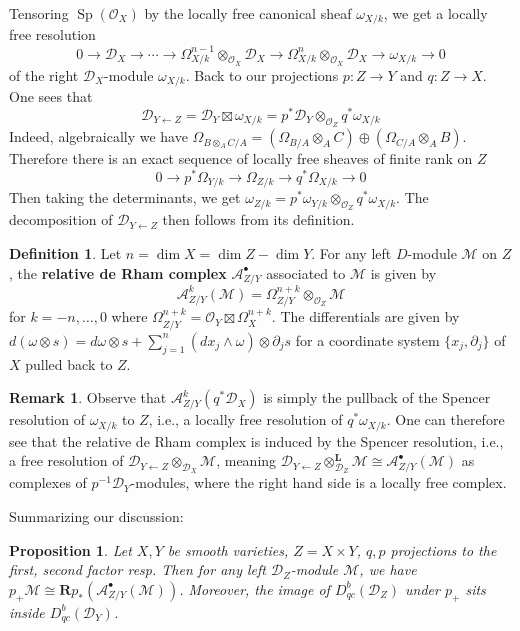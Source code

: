 \documentclass[11pt, a4paper]{article}
\newtheorem{proposition}[theorem]{Proposition}
\theoremstyle{definition}
\newtheorem{remark}[theorem]{Remark}
\newtheorem{definition}[theorem]{Definition}
\newcommand{\w}[0]{\omega}
\newcommand{\dL}{\mathbf{L}}
\newcommand{\dR}{\mathbf{R}}
\newcommand{\Sp}{\operatorname{Sp}}
\begin{document}
    Tensoring $\Sp(\mathcal O_X)$ by the locally free canonical sheaf $\w_{X/k}$, we get a locally free resolution
    \[0\to\mathcal D_X\to\cdots\to\Omega_{X/k}^{n-1}\otimes_{\mathcal O_X}\mathcal D_X\to \Omega_{X/k}^n\otimes_{\mathcal O_X}\mathcal D_X\to\w_{X/k}\to 0\]
    of the right $\mathcal D_X$-module $\w_{X/k}$. Back to our projections $p:Z\to Y$ and $q:Z\to X$. One sees that
    \[\mathcal D_{Y\leftarrow Z}=\mathcal D_Y\boxtimes \w_{X/k}=p^*\mathcal D_Y\otimes_{\mathcal O_Z}q^*\w_{X/k}\]
    Indeed, algebraically we have $\Omega_{B\otimes_A C/A}=(\Omega_{B/A}\otimes_A C)\oplus (\Omega_{C/A}\otimes_A B)$. Therefore there is an exact sequence of locally free sheaves of finite rank on $Z$
    \[0\to p^*\Omega_{Y/k}\to \Omega_{Z/k}\to q^*\Omega_{X/k}\to 0\]
    Then taking the determinants, we get $\w_{Z/k}=p^*\w_{Y/k}\otimes_{\mathcal O_Z}q^*\w_{X/k}$. The decomposition of $\mathcal D_{Y\leftarrow Z}$ then follows from its definition. 
    \begin{definition}
        Let $n=\dim X=\dim Z-\dim Y$. For any left $D$-module $\mathcal M$ on $Z$, the \textbf{relative de Rham complex} $\mathcal A_{Z/Y}^\bullet$ associated to $\mathcal M$ is given by
        \[\mathcal A_{Z/Y}^k(\mathcal M)=\Omega_{Z/Y}^{n+k}\otimes_{\mathcal O_Z}\mathcal M\]
        for $k=-n,\dots,0$ where $\Omega_{Z/Y}^{n+k}=\mathcal O_Y\boxtimes\Omega^{n+k}_{X}$. The differentials are given by $d(\w\otimes s)=d\w\otimes s+\sum_{j=1}^n (dx_j\wedge \w)\otimes\partial_j s$ for a coordinate system $\{x_j,\partial_j\}$ of $X$ pulled back to $Z$.
    \end{definition}
    \begin{remark}
        Observe that $\mathcal A_{Z/Y}^k(q^*\mathcal D_X)$ is simply the pullback of the Spencer resolution of $\w_{X/k}$ to $Z$, i.e., a locally free resolution of $q^*\w_{X/k}$. One can therefore see that the relative de Rham complex is induced by the Spencer resolution, i.e., a free resolution of $\mathcal D_{Y\leftarrow Z}\otimes_{\mathcal D_X}\mathcal M$, meaning $\mathcal D_{Y\leftarrow Z}\otimes_{\mathcal D_Z}^\dL \mathcal M\cong\mathcal A_{Z/Y}^\bullet(\mathcal M)$ as complexes of $p^{-1}\mathcal D_Y$-modules, where the right hand side is a locally free complex.
    \end{remark}
    Summarizing our discussion:
    \begin{proposition}\label{prop-dpush-qc}
        Let $X, Y$ be smooth varieties, $Z=X\times Y$, $q, p$ projections to the first, second factor resp. Then for any left $\mathcal D_Z$-module $\mathcal M$, we have $p_+\mathcal M\cong \dR p_*(\mathcal A_{Z/Y}^\bullet(\mathcal M))$. Moreover, the image of $D^b_{qc}(\mathcal D_Z)$ under $p_+$ sits inside $D^b_{qc}(\mathcal D_Y)$.
    \end{proposition}
\end{document}
